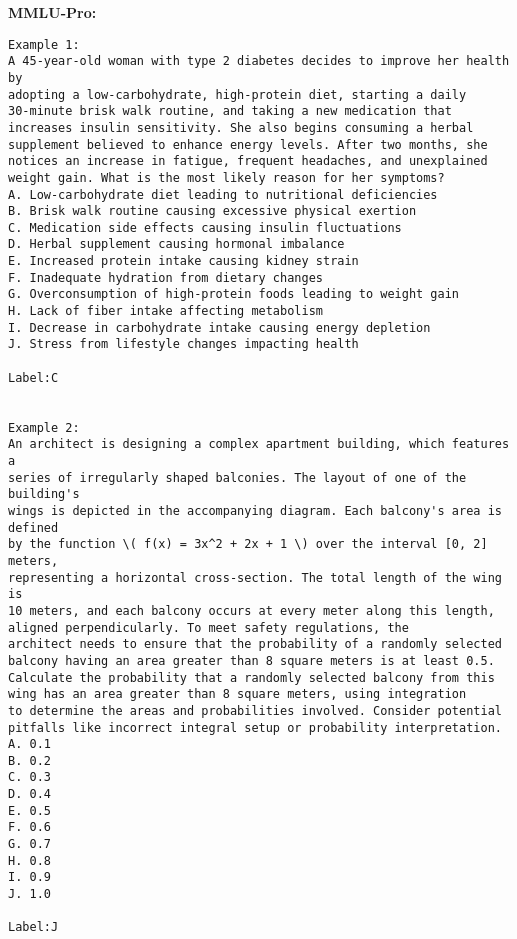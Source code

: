 \textbf{MMLU-Pro:}
\begin{lstlisting}
Example 1:
A 45-year-old woman with type 2 diabetes decides to improve her health by
adopting a low-carbohydrate, high-protein diet, starting a daily
30-minute brisk walk routine, and taking a new medication that
increases insulin sensitivity. She also begins consuming a herbal
supplement believed to enhance energy levels. After two months, she
notices an increase in fatigue, frequent headaches, and unexplained
weight gain. What is the most likely reason for her symptoms?
A. Low-carbohydrate diet leading to nutritional deficiencies
B. Brisk walk routine causing excessive physical exertion
C. Medication side effects causing insulin fluctuations
D. Herbal supplement causing hormonal imbalance
E. Increased protein intake causing kidney strain
F. Inadequate hydration from dietary changes
G. Overconsumption of high-protein foods leading to weight gain
H. Lack of fiber intake affecting metabolism
I. Decrease in carbohydrate intake causing energy depletion
J. Stress from lifestyle changes impacting health

Label:C


Example 2:
An architect is designing a complex apartment building, which features a 
series of irregularly shaped balconies. The layout of one of the building's
wings is depicted in the accompanying diagram. Each balcony's area is defined
by the function \( f(x) = 3x^2 + 2x + 1 \) over the interval [0, 2] meters,
representing a horizontal cross-section. The total length of the wing is
10 meters, and each balcony occurs at every meter along this length, 
aligned perpendicularly. To meet safety regulations, the 
architect needs to ensure that the probability of a randomly selected 
balcony having an area greater than 8 square meters is at least 0.5. 
Calculate the probability that a randomly selected balcony from this
wing has an area greater than 8 square meters, using integration
to determine the areas and probabilities involved. Consider potential
pitfalls like incorrect integral setup or probability interpretation.
A. 0.1
B. 0.2
C. 0.3
D. 0.4
E. 0.5
F. 0.6
G. 0.7
H. 0.8
I. 0.9
J. 1.0

Label:J
\end{lstlisting}

